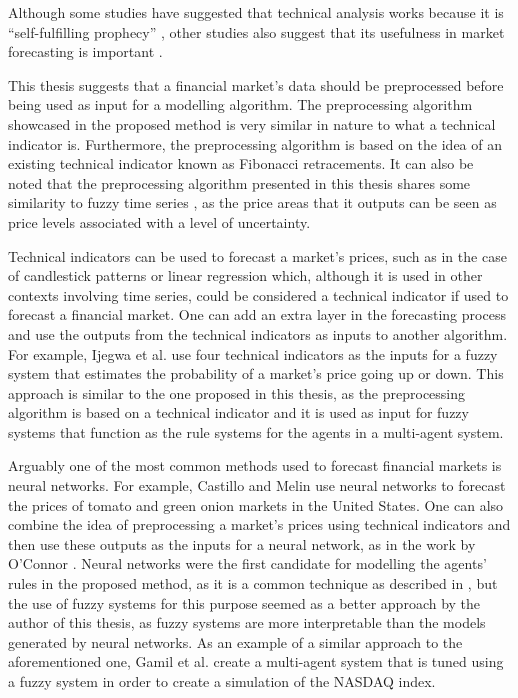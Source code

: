 Although some studies have suggested that technical analysis works because it is
``self-fulfilling prophecy'' \cite{Salganik2008} \cite{Fund1992}, other studies
also suggest that its usefulness in market forecasting is important
\cite{Kadiri2015} \cite{Fund1992}.

This thesis suggests that a financial market's data should be preprocessed
before being used as input for a modelling algorithm. The preprocessing
algorithm showcased in the proposed method is very similar in nature to what a
technical indicator is. Furthermore, the preprocessing algorithm is based on the
idea of an existing technical indicator known as Fibonacci retracements. It can
also be noted that the preprocessing algorithm presented in this thesis shares
some similarity to fuzzy time series \cite{Cai2013}, as the price areas that it
outputs can be seen as price levels associated with a level of uncertainty.

Technical indicators can be used to forecast a market's prices, such as in the
case of candlestick patterns \cite{Nison1991} or linear regression
\cite{kutner2004applied} which, although it is used in other contexts involving
time series, could be considered a technical indicator if used to forecast a
financial market. One can add an extra layer in the forecasting process and use
the outputs from the technical indicators as inputs to another algorithm. For
example, Ijegwa et al. \cite{Ijegwa2014} use four technical indicators as the
inputs for a fuzzy system that estimates the probability of a market's price
going up or down. This approach is similar to the one proposed in this thesis,
as the preprocessing algorithm is based on a technical indicator and it is used
as input for fuzzy systems that function as the rule systems for the agents in a
multi-agent system.

Arguably one of the most common methods used to forecast financial markets is
neural networks. For example, Castillo and Melin \cite{Castillo2001}
\cite{melin2007hybrid} use neural networks to forecast the prices of tomato and
green onion markets in the United States. One can also combine the idea of
preprocessing a market's prices using technical indicators and then use these
outputs as the inputs for a neural network, as in the work by O'Connor
\cite{Connor2005}. Neural networks were the first candidate for modelling the
agents' rules in the proposed method, as it is a common technique as described
in \cite{Grothmann2002}, but the use of fuzzy systems for this purpose seemed as
a better approach by the author of this thesis, as fuzzy systems are more
interpretable than the models generated by neural networks. As an example of a
similar approach to the aforementioned one, Gamil et al. \cite{Gamil2007} create
a multi-agent system that is tuned using a fuzzy system in order to create a
simulation of the NASDAQ index.

